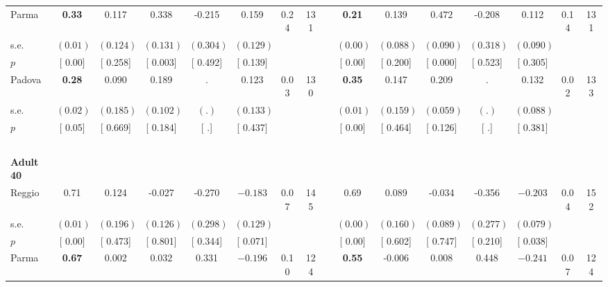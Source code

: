 \begin{longtable}{L{8em} c c c c c c c p{1em} c c c c c c c}
\quad \quad \quad Parma& \textbf{     0.33} &     0.117 & $ \mathbf{    0.338}$ &    -0.215 &     0.159 &      0.24 &       131 & & \textbf{     0.21} &     0.139 & $ \mathbf{    0.472}$ &    -0.208 &     0.112 &      0.14 &       131  \\*
\quad \quad \quad \quad s.e.& $ (     0.01)$ & $ (    0.124)$ & $ (    0.131)$ & $ (    0.304)$ & $ (    0.129)$ & & & & $ (     0.00)$ & $ (    0.088)$ & $ (    0.090)$ & $ (    0.318)$ & $ (    0.090)$ & &  \\*
\quad \quad \quad \quad $ p$ & [     0.00] & [    0.258] & [    0.003] & [    0.492] & [    0.139] & & & & [     0.00] & [    0.200] & [    0.000] & [    0.523] & [    0.305] & &  \\[1em]
\quad \quad \quad Padova& \textbf{     0.28} &     0.090 &     0.189 &         . &     0.123 &      0.03 &       130 & & \textbf{     0.35} &     0.147 &     0.209 &         . &     0.132 &      0.02 &       133  \\*
\quad \quad \quad \quad s.e.& $ (     0.02)$ & $ (    0.185)$ & $ (    0.102)$ & $ (        .)$ & $ (    0.133)$ & & & & $ (     0.01)$ & $ (    0.159)$ & $ (    0.059)$ & $ (        .)$ & $ (    0.088)$ & &  \\*
\quad \quad \quad \quad $ p$ & [     0.05] & [    0.669] & [    0.184] & [        .] & [    0.437] & & & & [     0.00] & [    0.464] & [    0.126] & [        .] & [    0.381] & &  \\[1em]
~\\[1em]
\quad \quad \textbf{Adult 40} & & & & & & & & & & & & & & & \\* 
\quad \quad \quad Reggio& 0.71 &     0.124 &    -0.027 &    -0.270 & $ \mathbf{   -0.183}$ &      0.07 &       145 & & 0.69 &     0.089 &    -0.034 &    -0.356 & $ \mathbf{   -0.203}$ &      0.04 &       152  \\*
\quad \quad \quad \quad s.e.& $ (     0.01)$ & $ (    0.196)$ & $ (    0.126)$ & $ (    0.298)$ & $ (    0.129)$ & & & & $ (     0.00)$ & $ (    0.160)$ & $ (    0.089)$ & $ (    0.277)$ & $ (    0.079)$ & &  \\*
\quad \quad \quad \quad $ p$ & [     0.00] & [    0.473] & [    0.801] & [    0.344] & [    0.071] & & & & [     0.00] & [    0.602] & [    0.747] & [    0.210] & [    0.038] & &  \\[1em]
\quad \quad \quad Parma& \textbf{     0.67} &     0.002 &     0.032 &     0.331 & $ \mathbf{   -0.196}$ &      0.10 &       124 & & \textbf{     0.55} &    -0.006 &     0.008 &     0.448 & $ \mathbf{   -0.241}$ &      0.07 &       124  \\*

\end{longtable}
